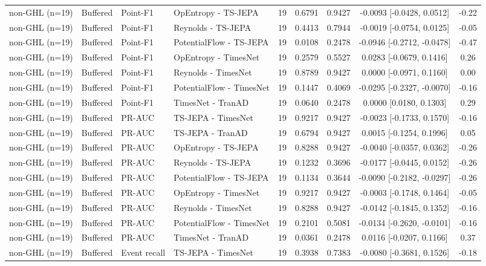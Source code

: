 \begin{table}[t]
\begin{tabular}{@{}llllccccc@{}}
non-GHL (n=19) & Buffered & Point-F1 & OpEntropy - TS-JEPA & 19 & 0.6791 & 0.9427 & -0.0093 [-0.0428, 0.0512] & -0.22 \\
non-GHL (n=19) & Buffered & Point-F1 & Reynolds - TS-JEPA & 19 & 0.4413 & 0.7944 & -0.0019 [-0.0754, 0.0125] & -0.05 \\
non-GHL (n=19) & Buffered & Point-F1 & PotentialFlow - TS-JEPA & 19 & 0.0108 & 0.2478 & -0.0946 [-0.2712, -0.0478] & -0.47 \\
non-GHL (n=19) & Buffered & Point-F1 & OpEntropy - TimesNet & 19 & 0.2579 & 0.5527 & 0.0283 [-0.0679, 0.1416] & 0.26 \\
non-GHL (n=19) & Buffered & Point-F1 & Reynolds - TimesNet & 19 & 0.8789 & 0.9427 & 0.0000 [-0.0971, 0.1160] & 0.00 \\
non-GHL (n=19) & Buffered & Point-F1 & PotentialFlow - TimesNet & 19 & 0.1447 & 0.4069 & -0.0295 [-0.2327, -0.0070] & -0.16 \\
non-GHL (n=19) & Buffered & Point-F1 & TimesNet - TranAD & 19 & 0.0640 & 0.2478 & 0.0000 [0.0180, 0.1303] & 0.29 \\
non-GHL (n=19) & Buffered & PR-AUC & TS-JEPA - TimesNet & 19 & 0.9217 & 0.9427 & -0.0023 [-0.1733, 0.1570] & -0.16 \\
non-GHL (n=19) & Buffered & PR-AUC & TS-JEPA - TranAD & 19 & 0.6794 & 0.9427 & 0.0015 [-0.1254, 0.1996] & 0.05 \\
non-GHL (n=19) & Buffered & PR-AUC & OpEntropy - TS-JEPA & 19 & 0.8288 & 0.9427 & -0.0040 [-0.0357, 0.0362] & -0.26 \\
non-GHL (n=19) & Buffered & PR-AUC & Reynolds - TS-JEPA & 19 & 0.1232 & 0.3696 & -0.0177 [-0.0445, 0.0152] & -0.26 \\
non-GHL (n=19) & Buffered & PR-AUC & PotentialFlow - TS-JEPA & 19 & 0.1134 & 0.3644 & -0.0090 [-0.2182, -0.0297] & -0.26 \\
non-GHL (n=19) & Buffered & PR-AUC & OpEntropy - TimesNet & 19 & 0.9217 & 0.9427 & -0.0003 [-0.1748, 0.1464] & -0.05 \\
non-GHL (n=19) & Buffered & PR-AUC & Reynolds - TimesNet & 19 & 0.8288 & 0.9427 & -0.0142 [-0.1845, 0.1352] & -0.16 \\
non-GHL (n=19) & Buffered & PR-AUC & PotentialFlow - TimesNet & 19 & 0.2101 & 0.5081 & -0.0134 [-0.2620, -0.0101] & -0.16 \\
non-GHL (n=19) & Buffered & PR-AUC & TimesNet - TranAD & 19 & 0.0361 & 0.2478 & 0.0116 [-0.0207, 0.1166] & 0.37 \\
non-GHL (n=19) & Buffered & Event recall & TS-JEPA - TimesNet & 19 & 0.3938 & 0.7383 & -0.0080 [-0.3681, 0.1526] & -0.18 \\

\end{tabular}
\end{table}
